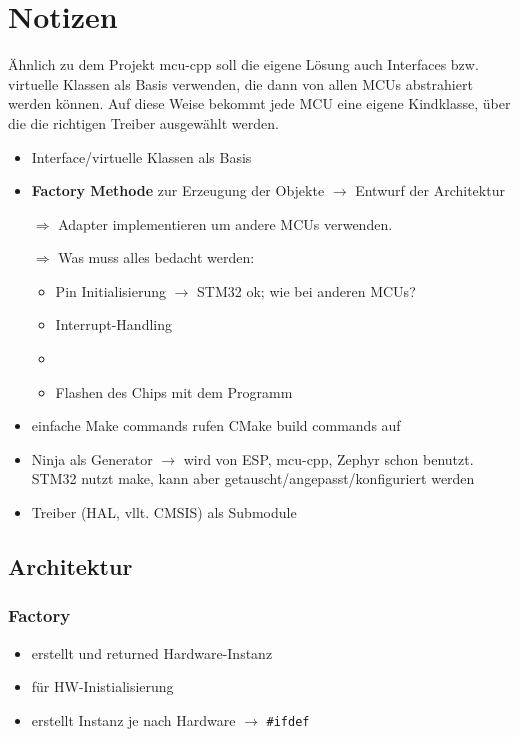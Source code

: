 \section{Notizen}
Ähnlich zu dem Projekt mcu-cpp soll die eigene Lösung auch Interfaces bzw. virtuelle Klassen als Basis verwenden, die dann von allen MCUs abstrahiert werden können.
Auf diese Weise bekommt jede MCU eine eigene Kindklasse, über die die richtigen Treiber ausgewählt werden.



\begin{itemize}
	\item Interface/virtuelle Klassen als Basis
	\item \textbf{Factory Methode} zur Erzeugung der Objekte $\rightarrow$ Entwurf der Architektur
	\item [$\Rightarrow$] Adapter implementieren um andere MCUs verwenden.
	\item [$\Rightarrow$] Was muss alles bedacht werden:
	\begin{itemize}
		\item Pin Initialisierung $\rightarrow$ STM32 ok; wie bei anderen MCUs?
		\item Interrupt-Handling
		\item 
		\item Flashen des Chips mit dem Programm
	\end{itemize}
	\item einfache Make commands rufen CMake build commands auf
	\item Ninja als Generator $\rightarrow$ wird von ESP, mcu-cpp, Zephyr schon benutzt. STM32 nutzt make, kann aber getauscht/angepasst/konfiguriert werden
	\item Treiber (HAL, vllt. CMSIS) als Submodule
\end{itemize}

\subsection{Architektur}
\subsubsection*{Factory}
\begin{itemize}
	\item erstellt und returned Hardware-Instanz
	\item für HW-Inistialisierung
	\item erstellt Instanz je nach Hardware $\rightarrow$ \texttt{\#ifdef}
\end{itemize}

